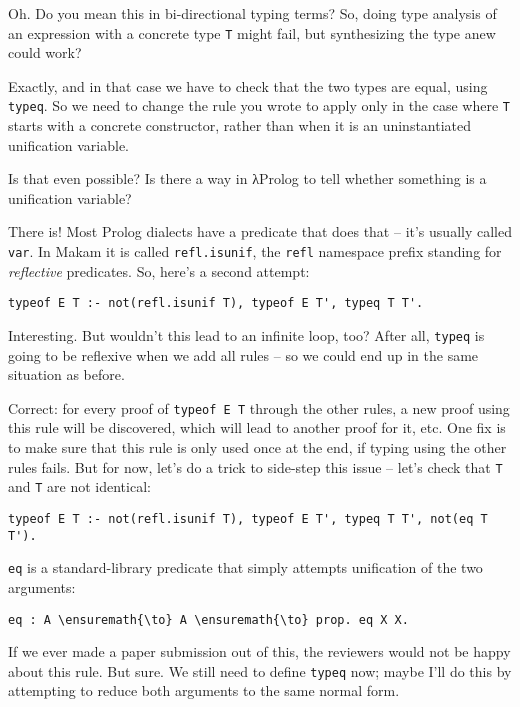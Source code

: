 \heroSTUDENT{} Oh. Do you mean this in bi-directional typing terms? So, doing
type analysis of an expression with a concrete type \texttt{T} might
fail, but synthesizing the type anew could work?

\heroADVISOR{} Exactly, and in that case we have to check that the two types
are equal, using \texttt{typeq}. So we need to change the rule you wrote
to apply only in the case where \texttt{T} starts with a concrete
constructor, rather than when it is an uninstantiated unification
variable.

\heroSTUDENT{} Is that even possible? Is there a way in \foreignlanguage{greek}{λ}Prolog to tell
whether something is a unification variable?

\heroADVISOR{} There is! Most Prolog dialects have a predicate that does that
-- it's usually called \texttt{var}. In Makam it is called
\texttt{refl.isunif}, the \texttt{refl} namespace prefix standing for
\emph{reflective} predicates. So, here's a second attempt:

\begin{verbatim}
typeof E T :- not(refl.isunif T), typeof E T', typeq T T'.
\end{verbatim}

\heroSTUDENT{} Interesting. But wouldn't this lead to an infinite loop, too?
After all, \texttt{typeq} is going to be reflexive when we add all rules
-- so we could end up in the same situation as before.

\heroADVISOR{} Correct: for every proof of
\texttt{typeof\ E\ T\textquotesingle{}} through the other rules, a new
proof using this rule will be discovered, which will lead to another
proof for it, etc. One fix is to make sure that this rule is only used
once at the end, if typing using the other rules fails. But for now,
let's do a trick to side-step this issue -- let's check that \texttt{T}
and \texttt{T\textquotesingle{}} are not identical:

\begin{verbatim}
typeof E T :- not(refl.isunif T), typeof E T', typeq T T', not(eq T T').
\end{verbatim}

\texttt{eq} is a standard-library predicate that simply attempts
unification of the two arguments:

\begin{verbatim}
eq : A \ensuremath{\to} A \ensuremath{\to} prop. eq X X.
\end{verbatim}

\heroSTUDENT{} If we ever made a paper submission out of this, the reviewers
would not be happy about this rule. But sure. We still need to define
\texttt{typeq} now; maybe I'll do this by attempting to reduce both
arguments to the same normal form.

